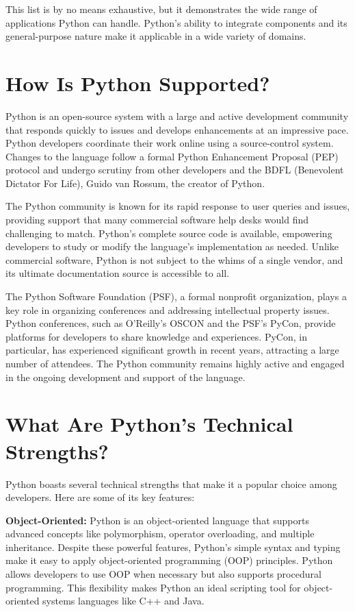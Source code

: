 \documentclass[12pt]{book}
\begin{document}
This list is by no means exhaustive, but it demonstrates the wide range of applications Python can handle. Python's ability to integrate components and its general-purpose nature make it applicable in a wide variety of domains.

\section{How Is Python Supported?}

Python is an open-source system with a large and active development community that responds quickly to issues and develops enhancements at an impressive pace. Python developers coordinate their work online using a source-control system. Changes to the language follow a formal Python Enhancement Proposal (PEP) protocol and undergo scrutiny from other developers and the BDFL (Benevolent Dictator For Life), Guido van Rossum, the creator of Python.

The Python community is known for its rapid response to user queries and issues, providing support that many commercial software help desks would find challenging to match. Python's complete source code is available, empowering developers to study or modify the language's implementation as needed. Unlike commercial software, Python is not subject to the whims of a single vendor, and its ultimate documentation source is accessible to all.

The Python Software Foundation (PSF), a formal nonprofit organization, plays a key role in organizing conferences and addressing intellectual property issues. Python conferences, such as O'Reilly's OSCON and the PSF's PyCon, provide platforms for developers to share knowledge and experiences. PyCon, in particular, has experienced significant growth in recent years, attracting a large number of attendees. The Python community remains highly active and engaged in the ongoing development and support of the language.

\section{What Are Python's Technical Strengths?}

Python boasts several technical strengths that make it a popular choice among developers. Here are some of its key features:

\textbf{Object-Oriented:} Python is an object-oriented language that supports advanced concepts like polymorphism, operator overloading, and multiple inheritance. Despite these powerful features, Python's simple syntax and typing make it easy to apply object-oriented programming (OOP) principles. Python allows developers to use OOP when necessary but also supports procedural programming. This flexibility makes Python an ideal scripting tool for object-oriented systems languages like C++ and Java.
\end{document}
